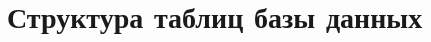 \documentclass[main]{subfiles}
\begin{document}
\section{Структура таблиц базы данных}\label{app:A}
\end{document}
